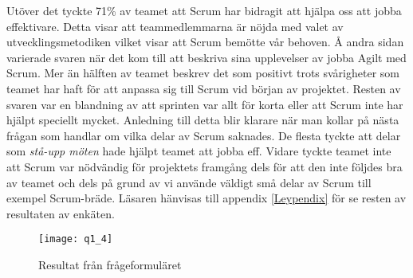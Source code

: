 Utöver det tyckte 71\% av teamet att Scrum har bidragit att hjälpa oss att jobba effektivare. Detta visar att teammedlemmarna är nöjda med valet av utvecklingsmetodiken vilket visar att Scrum bemötte vår behoven. Å andra sidan varierade svaren när det kom till att beskriva sina upplevelser av jobba Agilt med Scrum. Mer än hälften av teamet beskrev det som positivt trots svårigheter som teamet har haft för att anpassa sig till Scrum vid början av projektet. Resten av svaren var en blandning av att sprinten var allt för korta eller att Scrum inte har hjälpt speciellt mycket. Anledning till detta blir klarare när man kollar på nästa frågan som handlar om vilka delar av Scrum saknades. De flesta tyckte att delar som \textit{stå-upp möten} hade  hjälpt teamet att jobba eff. Vidare tyckte teamet inte att Scrum var nödvändig för projektets framgång dels för att den inte följdes bra av teamet och dels på grund av vi använde väldigt små delar av Scrum till exempel Scrum-bräde.
Läsaren hänvisas till appendix \ref{Leypendix} för se resten av resultaten av enkäten.
\begin{figure*}[h]
	\centering
	\texttt{[image: q1\_4]}
	\caption{Resultat från frågeformuläret}\label{fig1}
	\label{q1}
\end{figure*}
